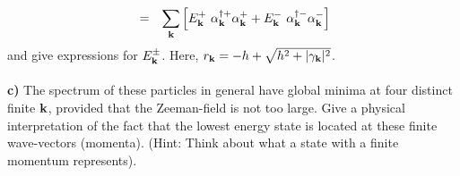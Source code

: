 \begin{problem}
\begin{eqnarray}
		& = &  \sum_{{\bf k}}  \left[  E^{+}_{{\bf k}} ~ \alpha^{\dagger +}_{{\bf k}} \alpha^{+}_{{\bf k}} 
		+ E^{-}_{{\bf k}} ~ \alpha^{\dagger -}_{{\bf k}} \alpha^{-}_{{\bf k}} \right]  \nonumber
	\end{eqnarray}
	and give expressions for $ E^{\pm}_{{\bf k}}$. Here, $r_{{\bf k}} =- h + \sqrt{h^2+|\gamma_{{\bf k}}|^2}$. 
	\ \\
	\ \\
	{\bf c)} The spectrum of these particles in general have global minima at four distinct finite ${\bf k}$, provided that the Zeeman-field is not too large. Give 
	a physical interpretation of the fact that the lowest energy state is located at these finite wave-vectors 
	(momenta). (Hint: Think about what a state with a finite momentum represents). 
\end{problem}




